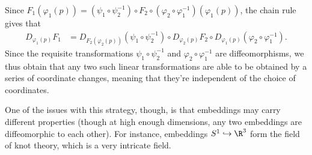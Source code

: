 \documentclass[10pt]{mypackage}
\renewcommand*{\mathbb}[1]{\varmathbb{#1}}
\begin{document}
\begin{remark}
  \begin{center}
  \end{center}
  Since $F_{1}\left( \varphi_1(p) \right) = \left( \psi_{1}\circ \psi_{2}^{-1} \right)\circ F_2 \circ \left( \varphi_2\circ \varphi_1^{-1} \right)\left( \varphi_1(p) \right)$, the chain rule gives that
  \begin{align*}
    D_{\varphi_1(p)}F_1 &= D_{F_2\left( \varphi_2(p) \right)}\left( \psi_1\circ \psi_2^{-1} \right) \circ D_{\varphi_2(p)}F_2 \circ D_{\varphi_1(p)}\left( \varphi_2\circ \varphi_1^{-1} \right).
  \end{align*}
  Since the requisite transformations $\psi_1\circ \psi_2^{-1}$ and $\varphi_2\circ \varphi_1^{-1}$ are diffeomorphisms, we thus obtain that any two such linear transformations are able to be obtained by a series of coordinate changes, meaning that they're independent of the choice of coordinates.
\end{remark}
One of the issues with this strategy, though, is that embeddings may carry different properties (though at high enough dimensions, any two embeddings are diffeomorphic to each other). For instance, embeddings $S^{1}\hookrightarrow \R^{3}$ form the field of knot theory, which is a very intricate field.\newline
\end{document}
